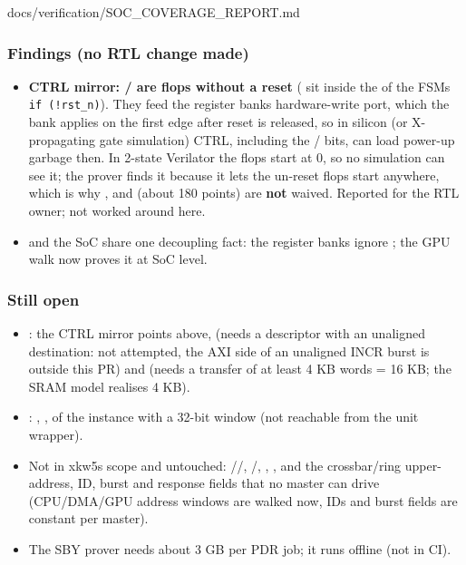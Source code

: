 \begin{relocated}{docs/verification/SOC_COVERAGE_REPORT.md}
\subsubsection{Findings (no RTL change made)}\label{tm:flow:soc-coverage-report:findings-no-rtl-change-made}

\begin{itemize}
\tightlist
\item
  \textbf{ CTRL mirror:  /
   are flops without a reset}
  ( sit inside the  of the
  FSM\textquotesingle s \texttt{if\ (!rst\_\allowbreak{}n)}). They feed
  the register bank\textquotesingle s hardware-write port, which the
  bank applies on the first edge after reset is released, so in silicon
  (or X-propagating gate simulation) CTRL, including the
  / bits, can load power-up garbage then.
  In 2-state Verilator the flops start at 0, so no simulation can see
  it; the prover finds it because it lets the un-reset flops start
  anywhere, which is why , 
  and  (about 180 points) are \textbf{not}
  waived. Reported for the RTL owner; not worked around here.
\item
   and the SoC share one decoupling fact: the
  register banks ignore ; the GPU walk now proves it at
  SoC level.
\end{itemize}

\subsubsection{Still open}\label{tm:flow:soc-coverage-report:still-open}

\begin{itemize}
\tightlist
\item
  : the CTRL mirror points above, 
  (needs a descriptor with an unaligned destination: not attempted, the
  AXI side of an unaligned INCR burst is outside this PR) and
   (needs a transfer of at least 4 KB words =
  16 KB; the SRAM model realises 4 KB).
\item
  : ,
  ,  of the instance with
  a 32-bit window (not reachable from the unit wrapper).
\item
  Not in xkw5\textquotesingle s scope and untouched:
  //,
  /, ,
  , and the crossbar/\allowbreak{}ring upper-address, ID,
  burst and response fields that no master can drive
  (CPU/\allowbreak{}DMA/\allowbreak{}GPU address windows are walked now,
  IDs and burst fields are constant per master).
\item
  The SBY prover needs about 3 GB per PDR job; it runs offline (not in
  CI).
\end{itemize}


\end{relocated}
